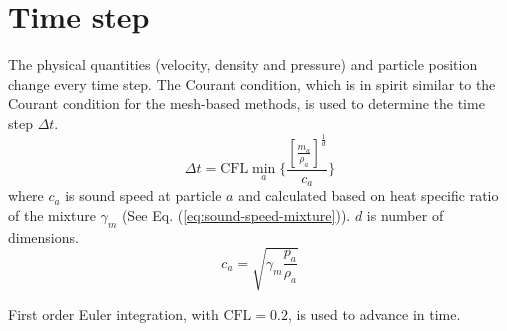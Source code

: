 \section{Time step}
The physical quantities (velocity, density and pressure) and particle position change every time step. The Courant condition, which is in spirit similar to the Courant condition for the mesh-based methods, is used to determine the time step $\Delta t$.
\begin{equation}
\Delta t = \textrm{CFL} \min_a \bigg \lbrace \dfrac{\left[\frac{m_a}{\rho_a}\right]^{\frac{1}{d}}}{c_a} \bigg \rbrace
\end{equation}
where $c_a$ is sound speed at particle $a$ and calculated based on heat specific ratio of the mixture $\gamma_m$ (See Eq. (\ref{eq:sound-speed-mixture})). 
$d$ is number of dimensions. 
\begin{equation}
c_a = \sqrt{\gamma_m \frac{p_a}{\rho_a}}
\label{eq:sound-speed-mixture}
\end{equation}

First order Euler integration, with $\textrm{CFL} = 0.2$, is used to advance in time.


